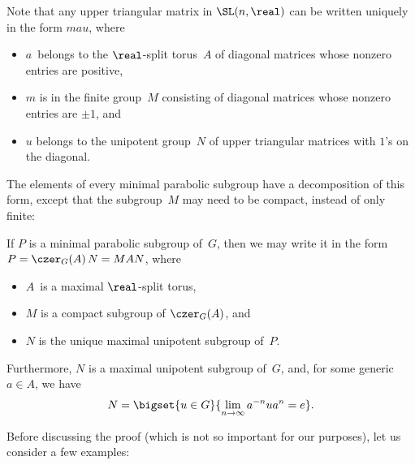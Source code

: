 
Note that any upper triangular matrix in $\SL(n,\real)$ can be written uniquely in the form $mau$, where
	\begin{itemize}
	\item $a$~belongs to the $\real$-split torus~$A$ of diagonal matrices whose nonzero entries are positive,
	\item $m$ is in the finite group~$M$ consisting of diagonal matrices whose nonzero entries are $\pm1$,
	and
	\item $u$ belongs to the unipotent group~$N$ of upper triangular matrices with $1$'s on the diagonal.
	\end{itemize}
The elements of every minimal parabolic subgroup have a decomposition of this form, except that the subgroup~$M$ may need to be compact, instead of only finite:

\begin{thm} \label{LanglandsDecomp}
 If $P$ is a minimal parabolic subgroup of~$G$, then we may write it in the form
 $P = \czer_G(A)\, N = MAN$, where%
	 \begin{itemize}
	 \item $A$~is a maximal $\real$-split torus, 
	 \item $M$ is a compact subgroup of $\czer_G(A)$,
	 and 
	 \item $N$ is the unique maximal unipotent subgroup of~$P$.
	 \end{itemize}
 Furthermore, $N$ is a maximal unipotent subgroup of~$G$, and, for some generic $a \in A$, we have
 	\begin{align} \label{LanglandsDecomp-N}
	N = \bigset{ u \in G }{ \lim_{n \to \infty} a^{-n} u a^n = e } 
	. \end{align}
 \end{thm}
 
 Before discussing the proof (which is not so important for our purposes), let us consider a few examples:

